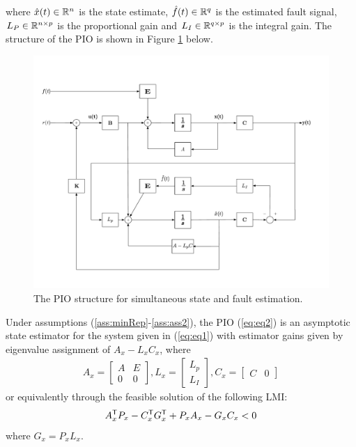 \documentclass[letterpaper, 11 pt, conference]{ieeeconf}  %
\begin{document}
where $\hat{x}(t) \in \mathbb{R}^n$ is the state estimate, $\hat{f}(t) \in \mathbb{R}^q$ is the estimated fault signal, $L_P \in \mathbb{R}^{n \times p}$ is the proportional gain and $L_I \in \mathbb{R}^{q \times p}$ is the integral gain. The structure of the PIO is shown in Figure \ref{fig:PIO} below.
\begin{figure}[H]
    \centering
    \includegraphics[scale=0.22]{images/PIO_FDIR.pdf}
    \caption{The PIO structure for simultaneous state and fault estimation.}
    \label{fig:PIO}
\end{figure}
\begin{theorem} \label{thrm:thrm1}
Under assumptions (\ref{ass:minRep}-\ref{ass:ass2}), the PIO (\ref{eq:eq2}) is an asymptotic state estimator for the system given in (\ref{eq:eq1}) with estimator gains given by eigenvalue assignment of $A_x - L_x C_x$, where 
\begin{align*}
A_x = \left [ \begin{array}{cc} A & E \\ 0 & 0 \end{array} \right ], 
L_x = \left [ \begin{array}{c} L_p \\ L_I \end{array} \right], 
C_x = \left [\begin{array}{cc} C & 0 \end{array} \right ] 
\end{align*}
or equivalently through the feasible solution of the following LMI:
\begin{align} \label{eq:eq3}
A_x^{\mathsf{T}} P_x - C_x^{\mathsf{T}}G_x^{\mathsf{T}}+P_x A_x - G_x C_x  < 0 
\end{align}
where $G_x = P_x L_x$. 
\end{theorem}
\end{document}
